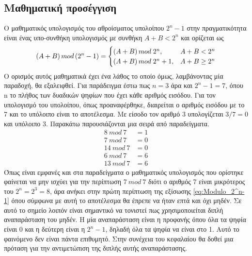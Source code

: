 \subsection{Μαθηματική προσέγγιση}
Ο μαθηματικός υπολογισμός του αθροίσματος υπολοίπου $2^n-1$ στην πραγματικότητα είναι 
ένας υπο-συνθήκη υπολογισμός με συνθήκη $A+B < 2^n$ και ορίζεται ως 
\begin{equation}
\label{eq:Modulo_2^n-1}
\equationame{Ορισμός άθροισης υπολοίπου $2^n-1$}
(A+B)\, mod\, (2^n-1) = 
\begin{cases}
    (A+B)\, mod\; 2^n       , &  A+B < 2^n\\
    (A+B)\, mod\; 2^n + 1   , & A+B \geq 2^n
\end{cases}
\end{equation}
Ο ορισμός αυτός μαθηματικά έχει ένα λάθος το οποίο όμως, λαμβάνοντας μία 
παραδοχή, θα εξαλειφθεί.
Για παράδειγμα έστω πως $n=3$ άρα και $2^n-1 = 7$, όπου n το πλήθος των δυαδικών ψηφίων
που έχει κάθε αριθμός εισόδου. Για τον υπολογισμό του υπολοίπου, όπως προαναφέρθηκε,
διαιρείται ο αριθμός εισόδου με το 7 και το υπόλοιπο είναι το αποτέλεσμα. Με είσοδο 
τον αριθμό 3 υπολογίζεται $3/7 = 0$ και υπόλοιπο 3. Παρακάτω παρουσιάζονται μια σειρά από 
παραδείγματα.
\begin{equation*}
    \begin{split}
        8\ mod\ 7 &= 1 \\
        7\ mod\ 7 &= 0 \\
        14\ mod\ 7 &= 0 \\
        6\ mod\ 7 &= 6 \\
        13\ mod\ 7 &= 6
    \end{split}
\end{equation*}
Όπως είναι εμφανές και στα παραδείγματα ο μαθηματικός υπολογισμός που ορίστηκε φαίνεται να 
μην ισχύει για την περίπτωση $7\ mod\ 7$ διότι ο αριθμός 7 είναι μικρότερος του $2^n = 2^3 = 8$,
άρα ανήκει στην πρώτη περίπτωση της εξίσωσης \ref{eq:Modulo_2^n-1} όπου σύμφωνα με αυτή το 
αποτέλεσμα θα έπρεπε να ήταν επτά και όχι μηδέν. Σε αυτό το σημείο λοιπόν είναι σημαντικό
να τονιστεί πως χρησιμοποιείται διπλή αναπαράσταση του μηδέν. Η μία αναπαράσταση είναι η 
προφανής όπου όλα τα ψηφία είναι 0 και η δεύτερη είναι η $2^n-1$, δηλαδή όλα τα ψηφία 
να είναι στο 1. Αυτό το φαινόμενο δεν είναι πάντα επιθυμητό. Στην συνέχεια του κεφαλαίου
θα δοθεί μια πρόταση για την αντιμετώπιση της διπλής αυτής αναπαράστασης.

